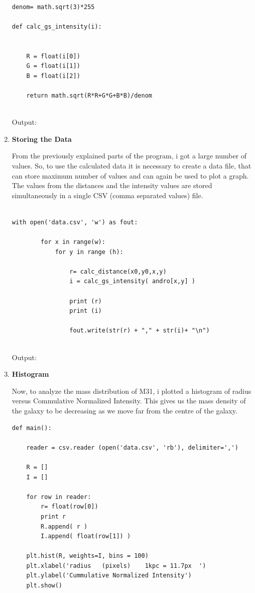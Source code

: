 \documentclass{article}
\begin{document}
\begin{enumerate}
\begin{verbatim}

denom= math.sqrt(3)*255

def calc_gs_intensity(i):


    R = float(i[0])
    G = float(i[1])
    B = float(i[2])

    return math.sqrt(R*R+G*G+B*B)/denom


\end{verbatim}

Output: 

\item \textbf{Storing the Data}

From the previously explained parts of the program, i got a large number of values. So, to use the calculated data it is necessary to create a data file, that can store maximum number of values and can again be used to plot a graph. The values from the distances and the intensity values are stored simultaneously in a single CSV (comma separated values) file.  
\begin{verbatim}

with open('data.csv', 'w') as fout:

        for x in range(w):
            for y in range (h):

                r= calc_distance(x0,y0,x,y)
                i = calc_gs_intensity( andro[x,y] )

                print (r)
                print (i)

                fout.write(str(r) + "," + str(i)+ "\n")


\end{verbatim}
Output: 

\item \textbf{Histogram}

Now, to analyze the mass distribution of M31, i plotted a histogram of radius versus Commulative Normalized Intensity. This gives us the mass density of the galaxy to be decreasing as we move far from the centre of the galaxy.  
\begin{verbatim}
def main():

    reader = csv.reader (open('data.csv', 'rb'), delimiter=',')

    R = []
    I = []

    for row in reader:
        r= float(row[0])
        print r
        R.append( r )
        I.append( float(row[1]) )

    plt.hist(R, weights=I, bins = 100)
    plt.xlabel('radius   (pixels)    1kpc = 11.7px  ')
    plt.ylabel('Cummulative Normalized Intensity')
    plt.show()


\end{verbatim}
\end{enumerate}
\end{document}

